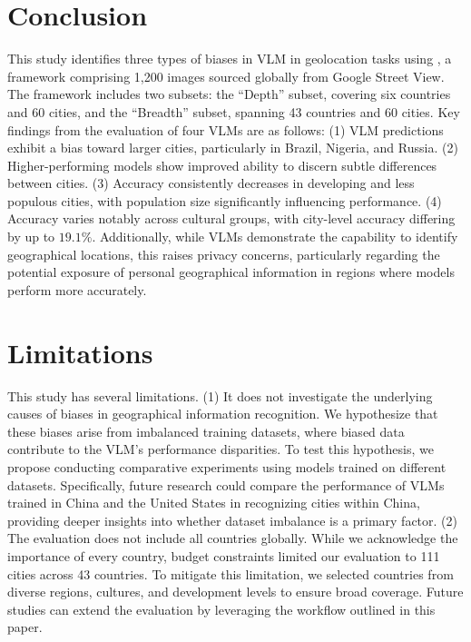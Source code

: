 \section{Conclusion}

This study identifies three types of biases in VLM in geolocation tasks using {\methodname}, a framework comprising 1,200 images sourced globally from Google Street View.
The framework includes two subsets: the ``Depth'' subset, covering six countries and 60 cities, and the ``Breadth'' subset, spanning 43 countries and 60 cities.
Key findings from the evaluation of four VLMs are as follows:
(1) VLM predictions exhibit a bias toward larger cities, particularly in Brazil, Nigeria, and Russia.
(2) Higher-performing models show improved ability to discern subtle differences between cities.
(3) Accuracy consistently decreases in developing and less populous cities, with population size significantly influencing performance.
(4) Accuracy varies notably across cultural groups, with city-level accuracy differing by up to $19.1\%$.
Additionally, while VLMs demonstrate the capability to identify geographical locations, this raises privacy concerns, particularly regarding the potential exposure of personal geographical information in regions where models perform more accurately.

\section*{Limitations}

This study has several limitations.
(1) It does not investigate the underlying causes of biases in geographical information recognition.
We hypothesize that these biases arise from imbalanced training datasets, where biased data contribute to the VLM's performance disparities.
To test this hypothesis, we propose conducting comparative experiments using models trained on different datasets.
Specifically, future research could compare the performance of VLMs trained in China and the United States in recognizing cities within China, providing deeper insights into whether dataset imbalance is a primary factor.
(2) The evaluation does not include all countries globally.
While we acknowledge the importance of every country, budget constraints limited our evaluation to 111 cities across 43 countries.
To mitigate this limitation, we selected countries from diverse regions, cultures, and development levels to ensure broad coverage.
Future studies can extend the evaluation by leveraging the workflow outlined in this paper.

